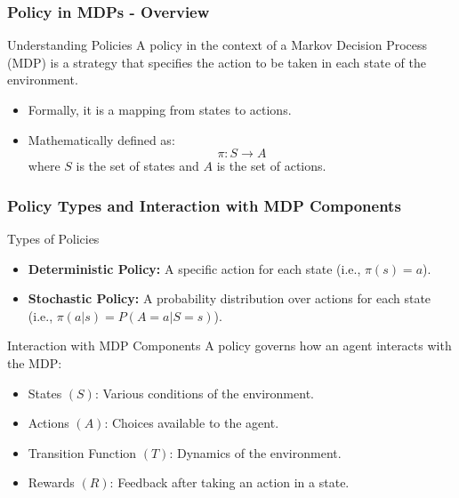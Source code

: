\documentclass[aspectratio=169]{beamer}
\begin{document}
\begin{frame}[fragile]
    \frametitle{Policy in MDPs - Overview}
    \begin{block}{Understanding Policies}
        A policy in the context of a Markov Decision Process (MDP) is a strategy that specifies the action to be taken in each state of the environment.
        \begin{itemize}
            \item Formally, it is a mapping from states to actions.
            \item Mathematically defined as: 
            \[
                \pi: S \rightarrow A
            \]
            where \( S \) is the set of states and \( A \) is the set of actions.
        \end{itemize}
    \end{block}
\end{frame}

\begin{frame}[fragile]
    \frametitle{Policy Types and Interaction with MDP Components}
    \begin{block}{Types of Policies}
        \begin{itemize}
            \item \textbf{Deterministic Policy:} 
                A specific action for each state (i.e., \( \pi(s) = a \)).
            \item \textbf{Stochastic Policy:} 
                A probability distribution over actions for each state (i.e., \( \pi(a|s) = P(A=a|S=s) \)).
        \end{itemize}
    \end{block}
    
    \begin{block}{Interaction with MDP Components}
        A policy governs how an agent interacts with the MDP:
        \begin{itemize}
            \item States \( (S) \): Various conditions of the environment.
            \item Actions \( (A) \): Choices available to the agent.
            \item Transition Function \( (T) \): Dynamics of the environment.
            \item Rewards \( (R) \): Feedback after taking an action in a state.
        \end{itemize}
    \end{block}
\end{frame}
\end{document}
